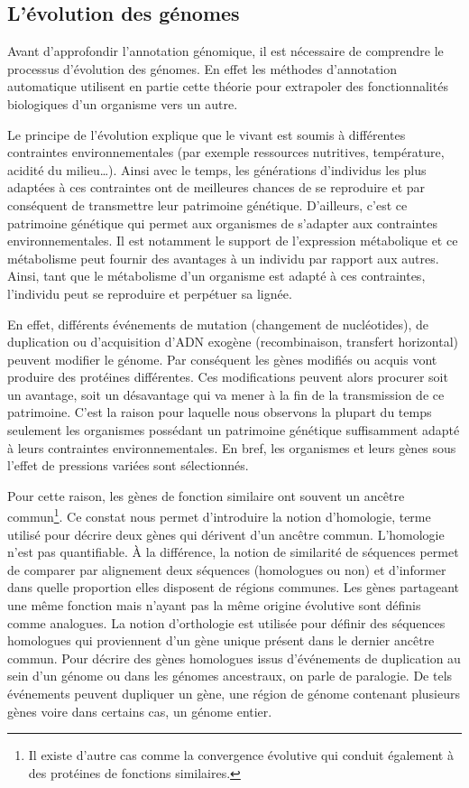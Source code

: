 \begin{refsegment}
    \subsection{L'évolution des génomes}
    Avant d'approfondir l'annotation génomique, il est nécessaire de comprendre le processus d'évolution des génomes. En effet les méthodes d'annotation automatique utilisent en partie cette théorie pour extrapoler des fonctionnalités biologiques d'un organisme vers un autre.
    
    Le principe de l'évolution explique que le vivant est soumis à différentes contraintes environnementales (par exemple ressources nutritives, température, acidité du milieu\ldots ). Ainsi avec le temps, les générations d'individus les plus adaptées à ces contraintes ont de meilleures chances de se reproduire et par conséquent de transmettre leur patrimoine génétique. D'ailleurs, c'est ce patrimoine génétique qui permet aux organismes de s'adapter aux contraintes environnementales. Il est notamment le support de l'expression métabolique et ce métabolisme peut fournir des avantages à un individu par rapport aux autres. Ainsi, tant que le métabolisme d'un organisme est adapté à ces contraintes, l'individu peut se reproduire et perpétuer sa lignée.
    
    En effet, différents événements de mutation (changement de nucléotides), de duplication ou d'acquisition d'ADN exogène (recombinaison, transfert horizontal) peuvent modifier le génome. Par conséquent les gènes modifiés ou acquis vont produire des protéines différentes. Ces modifications peuvent alors procurer soit un avantage, soit un désavantage qui va mener à la fin de la transmission de ce patrimoine. C'est la raison pour laquelle nous observons la plupart du temps seulement les organismes possédant un patrimoine génétique suffisamment adapté à leurs contraintes environnementales. En bref, les organismes et leurs gènes sous l'effet de pressions variées sont sélectionnés.
    
    Pour cette raison, les gènes de fonction similaire ont souvent un ancêtre commun\footnote{Il existe d'autre cas comme la convergence évolutive qui conduit également à des protéines de fonctions similaires. }. Ce constat nous permet d'introduire la notion d'homologie, terme utilisé pour décrire deux gènes qui dérivent d'un ancêtre commun. L'homologie n'est pas quantifiable. À la différence, la notion de similarité de séquences permet de comparer par alignement deux séquences (homologues ou non) et d'informer dans quelle proportion elles disposent de régions communes. Les gènes partageant une même fonction mais n'ayant pas la même origine évolutive sont définis comme analogues. La notion d'orthologie est utilisée pour définir des séquences homologues qui proviennent d'un gène unique présent dans le dernier ancêtre commun. Pour décrire des gènes homologues issus d'événements de duplication au sein d'un génome ou dans les génomes ancestraux, on parle de paralogie. De tels événements peuvent dupliquer un gène, une région de génome contenant plusieurs gènes voire dans certains cas, un génome entier.
    

\end{refsegment}
